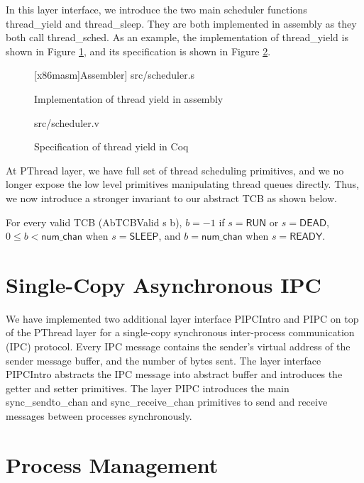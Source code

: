 In this layer interface, we introduce the two main scheduler functions \textsf{thread\_yield} and
\textsf{thread\_sleep}. They are both implemented in assembly as they both call \textsf{thread\_sched}.
As an example, the implementation of \textsf{thread\_yield} is shown in Figure \ref{fig:scheduler_s}, and
its specification is shown in Figure \ref{fig:scheduler_v}.

\begin{figure}
	{[x86masm]Assembler}] {src/scheduler.s}
	\caption{Implementation of thread yield in assembly}
	\label{fig:scheduler_s}
\end{figure}

\begin{figure}
	 {src/scheduler.v}
	\caption{Specification of thread yield in Coq}
	\label{fig:scheduler_v}
\end{figure}

At PThread layer, we have full set of thread scheduling primitives, and we no longer expose the low
level primitives manipulating thread queues directly. Thus, we now introduce a stronger invariant
to our abstract TCB as shown below.

\begin{invariant}
For every valid TCB (\textsf{AbTCBValid s b}), $b=-1$ if $s=\textsf{RUN}$ or $s=\textsf{DEAD}$,
$0\le b < \textsf{num\_chan}$ when $s=\textsf{SLEEP}$, and $b=\textsf{num\_chan}$ when $s=\textsf{READY}$.
\end{invariant}


\section{Single-Copy Asynchronous IPC}

We have implemented two additional layer interface PIPCIntro and PIPC on top of the PThread layer for a single-copy
synchronous inter-process communication (IPC) protocol. 
Every IPC message contains the sender's virtual address of the sender message buffer, and the number of bytes sent.
The layer interface PIPCIntro abstracts the IPC message into abstract buffer and introduces the getter and setter primitives.
The layer PIPC introduces the main \textsf{sync\_sendto\_chan} and \textsf{sync\_receive\_chan} primitives to send and receive
messages between processes synchronously. 

\section{Process Management}

